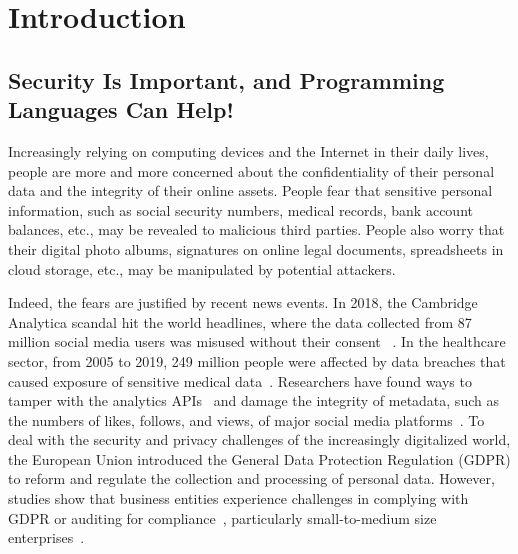 \chapter{Introduction}
\label{ch:intro}

\section{Security Is Important, and Programming Languages Can Help!}

Increasingly relying on computing devices and the Internet in their daily lives,
people are more and more concerned about the confidentiality of their personal
data and the integrity of their online assets. People fear that sensitive
personal information, such as social security numbers, medical records, bank
account balances, etc., may be revealed to malicious third parties. People also
worry that their digital photo albums, signatures on online legal documents,
spreadsheets in cloud storage, etc., may be manipulated by potential attackers.

Indeed, the fears are justified by recent news events. In 2018, the Cambridge
Analytica scandal hit the world headlines, where the data collected from 87
million social media users was misused without their consent
~\parencite{cadwalladr2018facebook,kitchgaessner2017cambridge,gonzalez2019global,hinds2020wouldn}.
In the healthcare sector, from 2005 to 2019, 249 million people were
affected by data breaches that caused exposure of sensitive medical
data~\parencite{seh2020healthcare}. Researchers have found ways to tamper with the
analytics APIs~\parencite{pfeffer2018tampering} and damage the integrity of
metadata, such as the numbers of likes, follows, and views, of major social
media platforms~\parencite{paquet2017can}. To deal with the security and privacy
challenges of the increasingly digitalized world, the European Union introduced
the General Data Protection Regulation (GDPR) to reform and regulate the
collection and processing of personal data. However, studies show that business
entities experience challenges in complying with GDPR or auditing for
compliance~\parencite{smirnova2024understanding}, particularly small-to-medium
size enterprises~\parencite{sirur2018we,freitas2018gdpr,harting2021impacts}.

